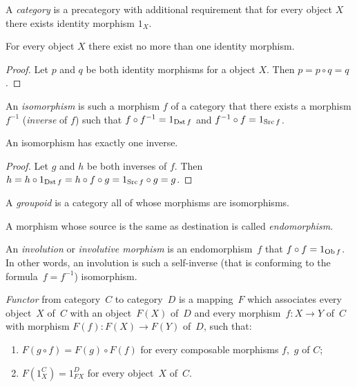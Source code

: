 \begin{defn}
A \emph{category} is a precategory with additional
requirement that for every object $X$ there exists identity morphism
$1_{X}$.\end{defn}
\begin{prop}
For every object $X$ there exist no more than one identity morphism.\end{prop}
\begin{proof}
Let $p$ and $q$ be both identity morphisms for a object $X$. Then
$p=p\circ q=q$.\end{proof}
\begin{defn}
An \emph{isomorphism} is such
a morphism $f$ of a category that there exists a morphism $f^{-1}$
(\emph{inverse} of $f$) such that $f\circ f^{-1}=1_{\operatorname{Dst} f}$ and
$f^{-1}\circ f=1_{\operatorname{Src} f}$.\end{defn}
\begin{prop}
An isomorphism has exactly one inverse.\end{prop}
\begin{proof}
Let $g$ and $h$ be both inverses of $f$. Then $h=h\circ1_{\operatorname{Dst} f}=h\circ f\circ g=1_{\operatorname{Src} f}\circ g=g$.\end{proof}
\begin{defn}
A \emph{groupoid} is a category all of whose morphisms
are isomorphisms.
\end{defn}

\begin{defn}
A morphism whose source is the same as destination
is called \emph{endomorphism}.
\end{defn}

\begin{defn}
An \emph{involution}
or \emph{involutive morphism} is an endomorphism~$f$ that $f\circ f=1_{\operatorname{Ob} f}$.
In other words, an involution is such a self-inverse (that is conforming
to the formula~$f=f^{-1}$) isomorphism.
\end{defn}

\begin{defn}
\emph{Functor} from category~$C$ to category~$D$ is a mapping~$F$
which associates every object~$X$ of~$C$ with an object~$F(X)$
of~$D$ and every morphism~$f:X\rightarrow Y$ of~$C$ with morphism
$F(f):F(X)\rightarrow F(Y)$ of~$D$, such that:
\begin{enumerate}
\item $F(g\circ f)=F(g)\circ F(f)$ for every composable morphisms $f$,~$g$
of $C$;
\item $F(1_{X}^{C})=1_{FX}^{D}$ for every object~$X$ of~$C$.
\end{enumerate}
\end{defn}

